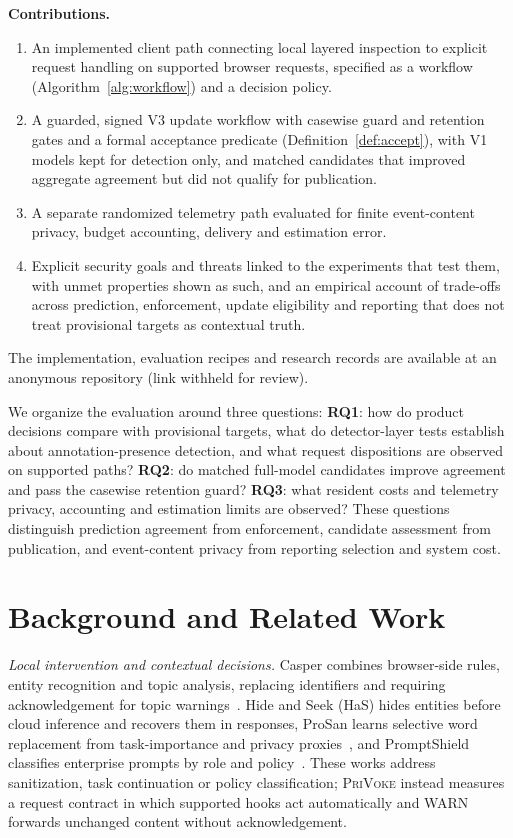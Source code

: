 \documentclass[sigconf]{acmart}
\theoremstyle{acmdefinition}\newtheorem{property}{Property}
\newcommand{\privoke}{\textsc{PriVoke}\xspace}
\begin{document}
\noindent\textbf{Contributions.}
\begin{enumerate}[itemsep=0pt]
\item An implemented client path connecting local layered inspection to explicit request handling on supported browser requests, specified as a workflow (Algorithm~\ref{alg:workflow}) and a decision policy.
\item A guarded, signed V3 update workflow with casewise guard and retention gates and a formal acceptance predicate (Definition~\ref{def:accept}), with V1 models kept for detection only, and matched candidates that improved aggregate agreement but did not qualify for publication.
\item A separate randomized telemetry path evaluated for finite event-content privacy, budget accounting, delivery and estimation error.
\item Explicit security goals and threats linked to the experiments that test them, with unmet properties shown as such, and an empirical account of trade-offs across prediction, enforcement, update eligibility and reporting that does not treat provisional targets as contextual truth.
\end{enumerate}
The implementation, evaluation recipes and research records are available at an anonymous repository (link withheld for review).

We organize the evaluation around three questions:
\textbf{RQ1}: how do product decisions compare with provisional targets, what do detector-layer tests establish about annotation-presence detection, and what request dispositions are observed on supported paths? \textbf{RQ2}: do matched full-model candidates improve agreement and pass the casewise retention guard? \textbf{RQ3}: what resident costs and telemetry privacy, accounting and estimation limits are observed? These questions distinguish prediction agreement from enforcement, candidate assessment from publication, and event-content privacy from reporting selection and system cost.

\section{Background and Related Work}
\label{sec:literature_review}
\textit{Local intervention and contextual decisions.} Casper combines browser-side rules, entity recognition and topic analysis, replacing identifiers and requiring acknowledgement for topic warnings~\cite{CasperPreprintV12024,Casper2024}. Hide and Seek (HaS) hides entities before cloud inference and recovers them in responses, ProSan learns selective word replacement from task-importance and privacy proxies~\cite{HaS2024,ProSan2024}, and PromptShield classifies enterprise prompts by role and policy~\cite{PromptShield2025}. These works address sanitization, task continuation or policy classification; \privoke instead measures a request contract in which supported hooks act automatically and WARN forwards unchanged content without acknowledgement.
\end{document}
